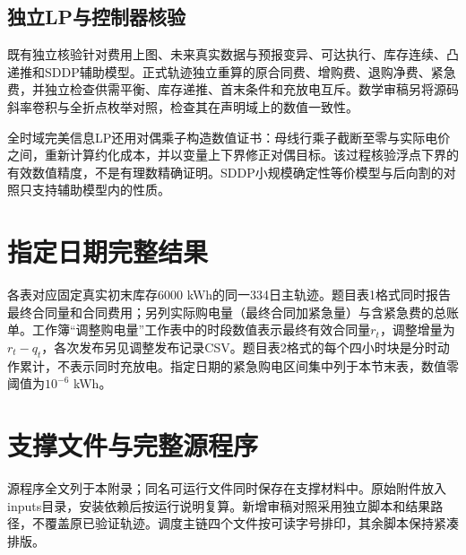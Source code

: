 \subsection{独立LP与控制器核验}
既有独立核验针对费用上图、未来真实数据与预报变异、可达执行、库存连续、凸递推和SDDP辅助模型。正式轨迹独立重算的原合同费、增购费、退购净费、紧急费，并独立检查供需平衡、库存递推、首末条件和充放电互斥。数学审稿另将源码斜率卷积与全折点枚举对照，检查其在声明域上的数值一致性。

全时域完美信息LP还用对偶乘子构造数值证书：母线行乘子截断至零与实际电价之间，重新计算约化成本，并以变量上下界修正对偶目标。该过程核验浮点下界的有效数值精度，不是有理数精确证明。SDDP小规模确定性等价模型与后向割的对照只支持辅助模型内的性质。


\clearpage
\section{指定日期完整结果}
各表对应固定真实初末库存6000 kWh的同一334日主轨迹。题目表1格式同时报告最终合同量和合同费用；另列实际购电量（最终合同加紧急量）与含紧急费的总账单。工作簿“调整购电量”工作表中的时段数值表示最终有效合同量$r_t$，调整增量为$r_t-q_t$，各次发布另见调整发布记录CSV。题目表2格式的每个四小时块是分时动作累计，不表示同时充放电。指定日期的紧急购电区间集中列于本节末表，数值零阈值为$10^{-6}$ kWh。

\clearpage
\clearpage
\clearpage


\clearpage\section{支撑文件与完整源程序}
源程序全文列于本附录；同名可运行文件同时保存在支撑材料中。原始附件放入inputs目录，安装依赖后按运行说明复算。新增审稿对照采用独立脚本和结果路径，不覆盖原已验证轨迹。调度主链四个文件按可读字号排印，其余脚本保持紧凑排版。


